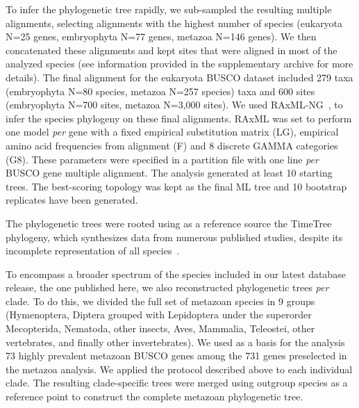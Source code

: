 To infer the phylogenetic tree rapidly, we sub-sampled the resulting multiple alignments, selecting alignments with the highest number of species (eukaryota N=25 genes, embryophyta N=77 genes, metazoa N=146 genes). We then concatenated these alignments and kept sites that were aligned in most of the analyzed species (see information provided in the supplementary archive for more details).
The final alignment for the eukaryota \acrshort{BUSCO} dataset included 279 taxa (embryophyta N=80 species, metazoa N=257 species) taxa and 600 sites (embryophyta N=700 sites, metazoa N=3,000 sites). We used RAxML-NG~\citep{kozlov_raxml-ng_2019}, to infer the species phylogeny on these final alignments. RAxML was set to perform one model \textit{per} gene with a fixed empirical substitution matrix (LG), empirical amino acid frequencies from alignment (F) and 8 discrete GAMMA categories (G8). These parameters were specified in a partition file with one line \textit{per} \acrshort{BUSCO} gene multiple alignment. The analysis generated at least 10 starting trees. The best-scoring topology was kept as the final \acrshort{ML} tree and 10 bootstrap replicates have been generated.

The phylogenetic trees were rooted using as a reference source the TimeTree phylogeny, which synthesizes data from numerous published studies, despite its incomplete representation of all species~\citep{kumar_timetree_2022}.

To encompass a broader spectrum of the species included in our latest database release, the one published here, we also reconstructed phylogenetic trees \textit{per} clade. To do this, we divided the full set of metazoan species in 9 groups (Hymenoptera, Diptera grouped with Lepidoptera under the superorder Mecopterida, Nematoda, other insects, Aves, Mammalia, Teleostei, other vertebrates, and finally other invertebrates). We used as a basis for the analysis 73 highly prevalent metazoan \acrshort{BUSCO} genes among the 731 genes preselected in the metazoa analysis. We applied the protocol described above to each individual clade. The resulting clade-specific trees were merged using outgroup species as a reference point to construct the complete metazoan phylogenetic tree.

